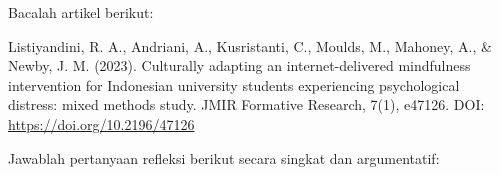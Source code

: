 \documentclass[
  indonesian,
  letterpaper,
  DIV=11,
  numbers=noendperiod]{scrreprt}
\begin{document}
\begin{tcolorbox}[enhanced jigsaw, colframe=quarto-callout-important-color-frame, toptitle=1mm, breakable, leftrule=.75mm, arc=.35mm, toprule=.15mm, colback=white, colbacktitle=quarto-callout-important-color!10!white, bottomtitle=1mm, bottomrule=.15mm, titlerule=0mm, title=\textcolor{quarto-callout-important-color}{\faExclamation}\hspace{0.5em}{Refleksi \& Diskusi}, coltitle=black, left=2mm, opacitybacktitle=0.6, opacityback=0, rightrule=.15mm]

Bacalah artikel berikut:

Listiyandini, R. A., Andriani, A., Kusristanti, C., Moulds, M., Mahoney,
A., \& Newby, J. M. (2023). Culturally adapting an internet-delivered
mindfulness intervention for Indonesian university students experiencing
psychological distress: mixed methods study. JMIR Formative Research,
7(1), e47126. DOI: \url{https://doi.org/10.2196/47126}

Jawablah pertanyaan refleksi berikut secara singkat dan argumentatif:


\end{tcolorbox}
\end{document}

